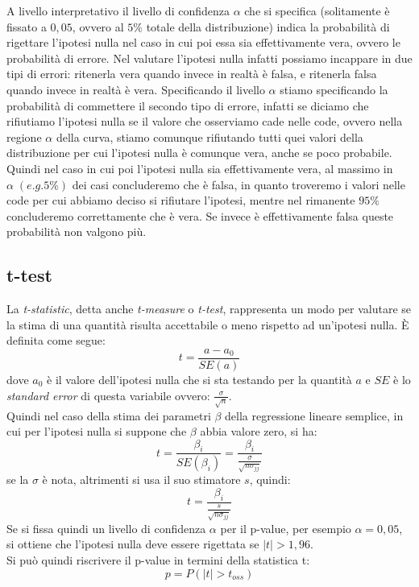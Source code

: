 \begin{tcolorbox}[colback=cyan!5!white, colframe=cyan!75!black, title = Il livello di confidenza $\alpha$]
	A livello interpretativo il livello di confidenza $\alpha$ che si specifica (solitamente è fissato a $0,05$, ovvero al $5\%$ totale della distribuzione) indica la probabilità di rigettare l'ipotesi nulla nel caso in cui poi essa sia effettivamente vera, ovvero le probabilità di errore. Nel valutare l'ipotesi nulla infatti possiamo incappare in due tipi di errori: ritenerla vera quando invece in realtà è falsa, e ritenerla falsa quando invece in realtà è vera. Specificando il livello $\alpha$ stiamo specificando la probabilità di commettere il secondo tipo di errore, infatti se diciamo che rifiutiamo l'ipotesi nulla se il valore che osserviamo cade nelle code, ovvero nella regione $\alpha$ della curva, stiamo comunque rifiutando tutti quei valori della distribuzione per cui l'ipotesi nulla è comunque vera, anche se poco probabile. Quindi nel caso in cui poi l'ipotesi nulla sia effettivamente vera, al massimo in $\alpha \; ( e.g.\!5\%)$ dei casi concluderemo che è falsa, in quanto troveremo i valori nelle code per cui abbiamo deciso si rifiutare l'ipotesi, mentre nel rimanente $95\%$ concluderemo correttamente che è vera. Se invece è effettivamente falsa queste probabilità non valgono più.
\end{tcolorbox}

\subsection{t-test}

La \textit{t-statistic}, detta anche \textit{t-measure} o \textit{t-test}, rappresenta un modo per valutare se la stima di una quantità risulta accettabile o meno rispetto ad un'ipotesi nulla. È definita come segue:
\begin{equation}
t = \frac{a - a_0}{SE(a)}
\end{equation}
dove $a_0$ è il valore dell'ipotesi nulla che si sta testando per la quantità $a$ e $SE$  è lo \textit{standard error} di questa variabile ovvero: $\frac{\sigma}{\sqrt{n}}$.\\
Quindi nel caso della stima dei parametri $\beta$ della regressione lineare semplice, in cui per l'ipotesi nulla si suppone che $\beta$ abbia valore zero,  si ha:
\begin{equation}
t = \frac{\beta_i}{SE(\beta_i)} = \frac{\beta_i}{\frac{\sigma}{\sqrt{n \sigma_{jj}}}}
\end{equation}
se la $\sigma$ è nota, altrimenti si usa il suo stimatore $s$, quindi:
\begin{equation}
t = \frac{\beta_i}{\frac{s}{\sqrt{n \sigma_{jj}}}}
\end{equation}
Se si fissa quindi un livello di confidenza $\alpha$ per il p-value,  per esempio $\alpha = 0,05$, si ottiene che l'ipotesi nulla deve essere rigettata se $\vert t \vert > 1,96$. \\
Si può quindi riscrivere il p-value in termini della statistica t:
\begin{equation}
p = P(\vert t \vert > t_{oss})
\end{equation}

